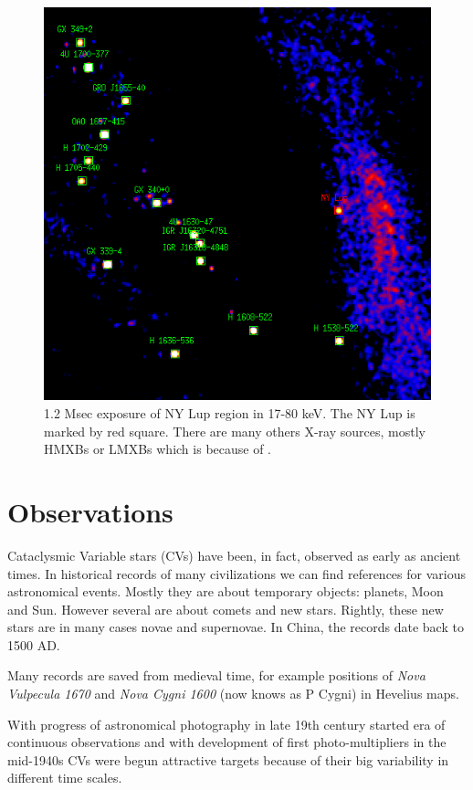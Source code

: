 \documentclass[oneside,a4paper,11pt]{report}
\begin{document}
\begin{figure}[!hbt]
\centering
\includegraphics[totalheight=12cm]{plot/ds9_3}
\caption{1.2 Msec exposure of NY Lup region in 17-80 keV. The NY Lup is marked by red square. There are many others X-ray sources,
mostly HMXBs or LMXBs which is because of .}
\label{nylup1} 
\end{figure}



\section{Observations}
Cataclysmic Variable stars (CVs) have been, in fact, observed as early as ancient times. In historical 
records of  many civilizations we can find references for various astronomical events. Mostly they are 
about temporary objects: planets, Moon and Sun. However several are about comets and new stars. Rightly, 
these new stars are in many cases novae and supernovae. In China, the records date back to 1500 AD. 

Many records are saved from medieval time, for example positions of \textit{Nova Vulpecula 1670} and 
\textit{Nova Cygni 1600} (now knows as P Cygni) in Hevelius maps. 

With progress of astronomical photography in late 19th century started era of continuous observations
and with  development of first photo-multipliers in the mid-1940s CVs were begun attractive 
targets because of their big variability in different time scales. 
\end{document}
